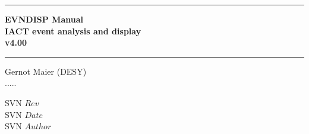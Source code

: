 
\newcommand{\HRule}{\rule{\linewidth}{1mm}}

\begin{titlepage}
\thispagestyle{empty}
\setlength{\parindent}{0mm}
\setlength{\parskip}{0mm}

\vspace*{10mm}
\HRule
\begin{flushright}
 \Huge \bf
  EVNDISP Manual \\
    IACT event analysis and display \\
     v4.00
\end{flushright}
\HRule
\vspace{10mm}
\begin{center}
   \Large
   
   \vspace{3.5cm}
  
   \vspace{0.5cm}
    
   \vspace{0.5cm}
   Gernot Maier (DESY) \\
   .....\\

   \vspace{6.3cm}

\end{center}
\begin{flushleft}
\Large
SVN $Rev$  \\
SVN $Date$ \\
SVN $Author$

\end{flushleft}


\end{titlepage}
